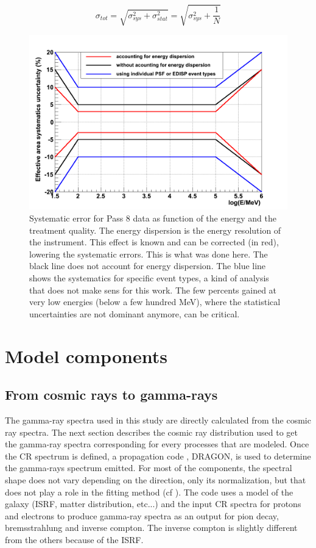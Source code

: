 \begin{equation}
\sigma_{tot} =\sqrt{\sigma_{sys}^2 + \sigma_{stat}^2} = \sqrt{\sigma_{sys}^2 + \frac{1}{N}}
\end{equation}


\begin{figure}[h]
 \centering
 \includegraphics[width=.5\linewidth]{pic/method/LAT_sys_error.png}
 \caption{Systematic error for Pass 8 data as function of the energy and the treatment quality. The energy dispersion is the energy resolution of the instrument. This effect is known and can be corrected (in red), lowering the systematic errors. This is what was done here. The black line does not account for energy dispersion. The blue line shows the systematics for specific event types, a kind of analysis that does not make sens for this work. 
The few percents gained at very low energies (below a few hundred MeV), where the statistical uncertainties are not dominant anymore, can be critical.}
 \label{fig:LAT_sys_err}
\end{figure}





\section{Model components}
\subsection{From cosmic rays to gamma-rays}

The gamma-ray spectra used in this study are directly calculated from the cosmic ray spectra. The next section describes the cosmic ray distribution used to get the gamma-ray spectra corresponding for every processes that are modeled. Once the CR spectrum is defined, a propagation code , DRAGON, is used to determine the gamma-rays spectrum emitted. For most of the components, the spectral shape does not vary depending on the direction, only its normalization, but that does not play a role in the fitting method (cf ).
The code uses a model of the galaxy (ISRF, matter distribution, etc...) and the input CR spectra for protons and electrons to produce gamma-ray spectra as an output for pion decay, bremsstrahlung and inverse compton. The inverse compton is slightly different from the others because of the ISRF.


